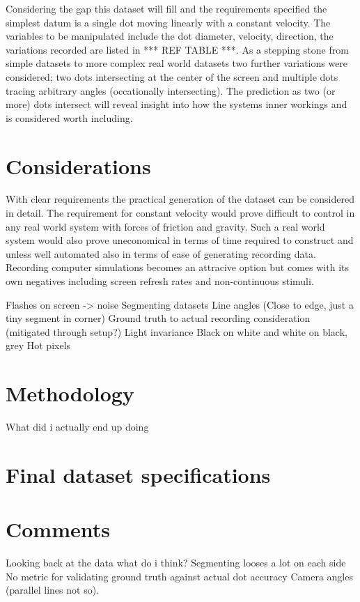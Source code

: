 Considering the gap this dataset will fill and the requirements specified the simplest datum is a single dot moving linearly with a constant velocity. 
The variables to be manipulated include the dot diameter, velocity, direction, the variations recorded are listed in *** REF TABLE ***.
As a stepping stone from simple datasets to more complex real world datasets two further variations were considered; two dots intersecting at the center of the screen and multiple dots tracing arbitrary angles (occationally intersecting). 
The prediction as two (or more) dots intersect will reveal insight into how the systems inner workings and is considered worth including. 



\section{Considerations}
With clear requirements the practical generation of the dataset can be considered in detail.
The requirement for constant velocity would prove difficult to control in any real world system with forces of friction and gravity.
Such a real world system would also prove uneconomical in terms of time required to construct and unless well automated also in terms of ease of generating recording data. 
Recording computer simulations becomes an attracive option but comes with its own negatives including screen refresh rates and non-continuous stimuli. 
 

Flashes on screen -> noise
Segmenting datasets
Line angles (Close to edge, just a tiny segment in corner)
Ground truth to actual recording consideration (mitigated through setup?)
Light invariance
Black on white and white on black, grey
Hot pixels

\section{Methodology}
What did i actually end up doing

\section{Final dataset specifications}


\section{Comments}
Looking back at the data what do i think?
Segmenting looses a lot on each side
No metric for validating ground truth against actual dot accuracy
Camera angles (parallel lines not so).




